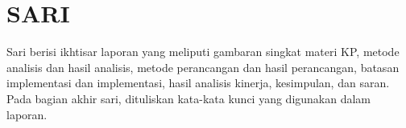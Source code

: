 \chapter*{SARI}

\vspace*{0.2cm}

Sari berisi ikhtisar laporan yang meliputi gambaran singkat materi KP, metode
analisis dan hasil analisis, metode perancangan dan hasil perancangan, batasan
implementasi dan implementasi, hasil analisis kinerja, kesimpulan, dan saran.
Pada bagian akhir sari, dituliskan kata-kata kunci yang digunakan dalam
laporan.


\newpage